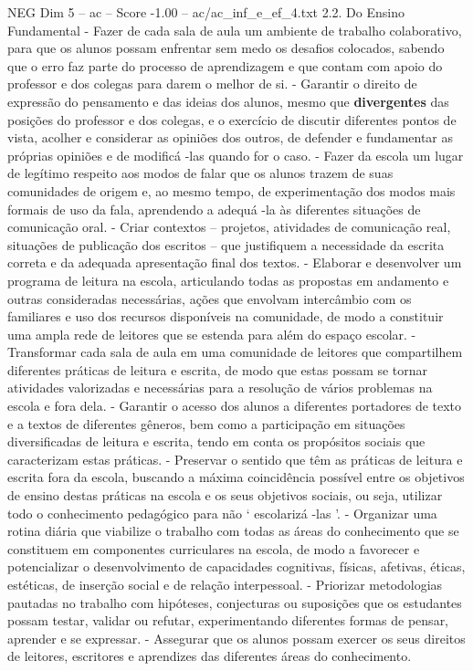 \begin{textsample}{NEG Dim 5 – ac – Score -1.00 – ac/ac\_inf\_e\_ef\_4.txt}  \label{ex:f5_neg_164}
2.2.
Do Ensino Fundamental - Fazer de cada sala de aula um ambiente de trabalho colaborativo, para que os alunos possam enfrentar sem medo os desafios colocados, sabendo que o erro faz parte do processo de aprendizagem e que contam com apoio do professor e dos colegas para darem o melhor de si. - Garantir o direito de expressão do pensamento e das ideias dos alunos, mesmo que \textbf{divergentes} das posições do professor e dos colegas, e o exercício de discutir diferentes pontos de vista, acolher e considerar as opiniões dos outros, de defender e fundamentar as próprias opiniões e de modificá -las quando for o caso. - Fazer da escola um lugar de legítimo respeito aos modos de falar que os alunos trazem de suas comunidades de origem e, ao mesmo tempo, de experimentação dos modos mais formais de uso da fala, aprendendo a adequá -la às diferentes situações de comunicação oral. - Criar contextos – projetos, atividades de comunicação real, situações de publicação dos escritos – que justifiquem a necessidade da escrita correta e da adequada apresentação final dos textos. - Elaborar e desenvolver um programa de leitura na escola, articulando todas as propostas em andamento e outras consideradas necessárias, ações que envolvam intercâmbio com os familiares e uso dos recursos disponíveis na comunidade, de modo a constituir uma ampla rede de leitores que se estenda para além do espaço escolar. - Transformar cada sala de aula em uma comunidade de leitores que compartilhem diferentes práticas de leitura e escrita, de modo que estas possam se tornar atividades valorizadas e necessárias para a resolução de vários problemas na escola e fora dela. - Garantir o acesso dos alunos a diferentes portadores de texto e a textos de diferentes gêneros, bem como a participação em situações diversificadas de leitura e escrita, tendo em conta os propósitos sociais que caracterizam estas práticas. - Preservar o sentido que têm as práticas de leitura e escrita fora da escola, buscando a máxima coincidência possível entre os objetivos de ensino destas práticas na escola e os seus objetivos sociais, ou seja, utilizar todo o conhecimento pedagógico para não ‘ escolarizá -las ’. - Organizar uma rotina diária que viabilize o trabalho com todas as áreas do conhecimento que se constituem em componentes curriculares na escola, de modo a favorecer e potencializar o desenvolvimento de capacidades cognitivas, físicas, afetivas, éticas, estéticas, de inserção social e de relação interpessoal. - Priorizar metodologias pautadas no trabalho com hipóteses, conjecturas ou suposições que os estudantes possam testar, validar ou refutar, experimentando diferentes formas de pensar, aprender e se expressar. - Assegurar que os alunos possam exercer os seus direitos de leitores, escritores e aprendizes das diferentes áreas do conhecimento.

\end{textsample}
